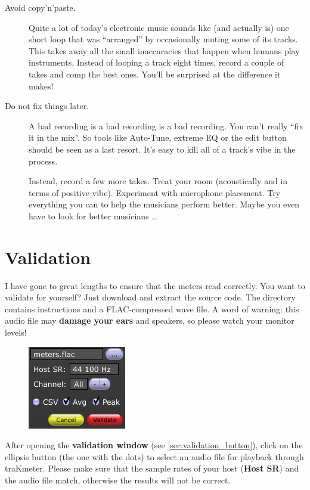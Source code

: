 \begin{description}
\item[Avoid copy'n'paste.]  Quite a lot of today's electronic music
  sounds like (and actually is) one short loop that was ``arranged''
  by occasionally muting some of its tracks.  This takes away all the
  small inaccuracies that happen when humans play instruments.
  Instead of looping a track eight times, record a couple of takes and
  comp the best ones.  You'll be surprised at the difference it makes!

\item[Do not fix things later.]  A bad recording is a bad recording is
  a bad recording.  You can't really ``fix it in the mix''.  So tools
  like Auto-Tune, extreme EQ or the edit button should be seen as a
  last resort.  It's easy to kill all of a track's vibe in the
  process.

  Instead, record a few more takes.  Treat your room (acoustically and
  in terms of positive vibe).  Experiment with microphone placement.
  Try everything you can to help the musicians perform better.  Maybe
  you even have to look for better musicians \dots

\end{description}

\chapter{Validation}
\label{chap:validation}

I have gone to great lengths to ensure that the meters read correctly.
You want to validate for yourself?  Just download and extract the
source code.  The directory  contains instructions
and a FLAC-compressed wave file.  A word of warning: this audio file
may \textbf{damage your ears} and speakers, so please watch your
monitor levels!

\begin{figure}
  \includegraphics[scale=0.65,clip]{include/images/dialog_validation.png}
\end{figure}

After opening the \textbf{validation window} (see
\ref{sec:validation_button}), click on the ellipsis button (the one
with the dots) to select an audio file for playback through traKmeter.
Please make sure that the sample rates of your host (\textbf{Host SR})
and the audio file match, otherwise the results will not be correct.

